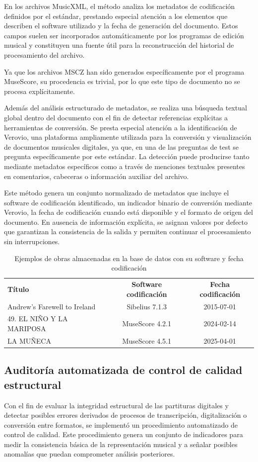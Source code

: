 En los archivos MusicXML, el método analiza los metadatos de codificación definidos por el estándar, prestando especial atención a los elementos que describen el software utilizado y la fecha de generación del documento. Estos campos suelen ser incorporados automáticamente por los programas de edición musical y constituyen una fuente útil para la reconstrucción del historial de procesamiento del archivo.

Ya que los archivos MSCZ han sido generados específicamente por el programa MuseScore, su procedencia es trivial, por lo que este tipo de documento no se procesa explícitamente.

Además del análisis estructurado de metadatos, se realiza una búsqueda textual global dentro del documento con el fin de detectar referencias explícitas a herramientas de conversión. Se presta especial atención a la identificación de Verovio, una plataforma ampliamente utilizada para la conversión y visualización de documentos musicales digitales, ya que, en una de las preguntas de test se pregunta específicamente por este estándar. La detección puede producirse tanto mediante metadatos específicos como a través de menciones textuales presentes en comentarios, cabeceras o información auxiliar del archivo.

Este método genera un conjunto normalizado de metadatos que incluye el software de codificación identificado, un indicador binario de conversión mediante Verovio, la fecha de codificación cuando está disponible y el formato de origen del documento. En ausencia de información explícita, se asignan valores por defecto que garantizan la consistencia de la salida y permiten continuar el procesamiento sin interrupciones.

\begin{table}[H]
\centering
\begin{tabular}{lcc}
\textbf{Título} & \textbf{Software codificación} & \textbf{Fecha codificación} \\
Andrew’s Farewell to Ireland & Sibelius 7.1.3 & 2015-07-01 \\
49. EL NIÑO Y LA MARIPOSA & MuseScore 4.2.1 & 2024-02-14 \\
LA MUÑECA & MuseScore 4.5.1 & 2025-04-01 \\
\end{tabular}
\caption{Ejemplos de obras almacenadas en la base de datos con su software y fecha codificación}
\end{table}

\subsection{Auditoría automatizada de control de calidad estructural}
Con el fin de evaluar la integridad estructural de las partituras digitales y detectar posibles errores derivados de procesos de transcripción, digitalización o conversión entre formatos, se implementó un procedimiento automatizado de control de calidad. Este procedimiento genera un conjunto de indicadores para medir la consistencia básica de la representación musical y a señalar posibles anomalías que puedan comprometer análisis posteriores.

